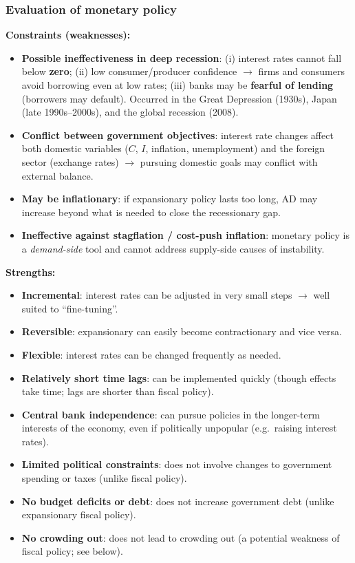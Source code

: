 \documentclass[a4paper,12pt]{article}
\begin{document}
\subsubsection*{Evaluation of monetary policy}
\textbf{Constraints (weaknesses):}
\begin{itemize}
  \item \textbf{Possible ineffectiveness in deep recession}: (i) interest rates cannot fall below \textbf{zero}; (ii) low consumer/producer confidence $\to$ firms and consumers avoid borrowing even at low rates; (iii) banks may be \textbf{fearful of lending} (borrowers may default). Occurred in the Great Depression (1930s), Japan (late 1990s--2000s), and the global recession (2008).
  \item \textbf{Conflict between government objectives}: interest rate changes affect both domestic variables ($C$, $I$, inflation, unemployment) and the foreign sector (exchange rates) $\to$ pursuing domestic goals may conflict with external balance.
  \item \textbf{May be inflationary}: if expansionary policy lasts too long, AD may increase beyond what is needed to close the recessionary gap.
  \item \textbf{Ineffective against stagflation / cost-push inflation}: monetary policy is a \textit{demand-side} tool and cannot address supply-side causes of instability.
\end{itemize}
\textbf{Strengths:}
\begin{itemize}
  \item \textbf{Incremental}: interest rates can be adjusted in very small steps $\to$ well suited to ``fine-tuning''.
  \item \textbf{Reversible}: expansionary can easily become contractionary and vice versa.
  \item \textbf{Flexible}: interest rates can be changed frequently as needed.
  \item \textbf{Relatively short time lags}: can be implemented quickly (though effects take time; lags are shorter than fiscal policy).
  \item \textbf{Central bank independence}: can pursue policies in the longer-term interests of the economy, even if politically unpopular (e.g.\ raising interest rates).
  \item \textbf{Limited political constraints}: does not involve changes to government spending or taxes (unlike fiscal policy).
  \item \textbf{No budget deficits or debt}: does not increase government debt (unlike expansionary fiscal policy).
  \item \textbf{No crowding out}: does not lead to crowding out (a potential weakness of fiscal policy; see below).
\end{itemize}
\end{document}
